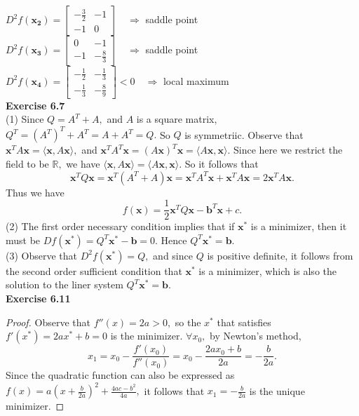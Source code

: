 \documentclass[letterpaper,12pt]{article}
\theoremstyle{definition}
\renewcommand{\vec}[1]{\mathbf{#1}}
\begin{document}
$D^2f(\vec{x_2})=\begin{bmatrix}
-\frac{3}{2}&-1\\-1&0
\end{bmatrix} \quad \Rightarrow$  saddle point\\
$D^2f(\vec{x_3})=\begin{bmatrix}
0&-1\\-1&-\frac{8}{3}
\end{bmatrix} \quad \Rightarrow$  saddle point\\
$D^2f(\vec{x_4})=\begin{bmatrix}
-\frac{1}{2}&-\frac{1}{3}\\-\frac{1}{3}&-\frac{8}{9}
\end{bmatrix}<0 \quad \Rightarrow$  local maximum\\


\noindent\textbf{Exercise 6.7}\\
(1) Since $Q = A^T + A,$ and $A$ is a square matrix, $Q^T = (A^T)^T + A^T = A + A^T = Q.$ So $Q$ is symmetriic.
Observe that $\vec{x}^T A \vec{x} = \langle \vec{x}, A\vec{x}\rangle,$ and $\vec{x}^T A^T \vec{x} = (A\vec{x})^T \vec{x} = \langle A\vec{x}, \vec{x}\rangle.$ Since here we restrict the field to be $\mathbb{R},$ we have $\langle \vec{x}, A\vec{x}\rangle =  \langle A\vec{x}, \vec{x}\rangle.$
So it follows that $$\vec{x}^T Q \vec{x} = \vec{x}^T (A^T + A) \vec{x} = \vec{x}^T A^T\vec{x} + \vec{x}^T A \vec{x} = 2\vec{x}^T A \vec{x}.$$ Thus we have $$f(\vec{x}) = \frac{1}{2}\vec{x}^T Q \vec{x} - \vec{b}^T \vec{x} + c.$$
(2) The first order necessary condition implies that if $\vec{x^*}$ is a minimizer, then it must be $Df{(\vec{x^*})}=Q^T \vec{x^*}-\vec{b} = 0.$ Hence $Q^T \vec{x^*} = \vec{b}.$ \\
(3) Observe that $D^2 f(\vec{x^*}) = Q,$ and since $Q$ is positive definite, it follows from the second order sufficient condition that $\vec{x^*}$ is a minimizer, which is also the solution to the liner system $Q^T \vec{x^*} = \vec{b}.$ \\

\noindent\textbf{Exercise 6.11}
\begin{proof}
  Observe that $f''(x) = 2a > 0,$ so the $x^*$ that satisfies $f'(x^*) = 2ax^* + b = 0$ is the minimizer. $\forall x_0,$ by Newton's method, $$x_1 = x_0 - \frac{f'(x_0)}{f''(x_0)} = x_0 - \frac{2ax_0+b}{2a} = -\frac{b}{2a}.$$ Since the quadratic function can also be expressed as $f(x) = a(x+\frac{b}{2a})^2 + \frac{4ac-b^2}{4a},$ it follows that $x_1 = -\frac{b}{2a}$ is the unique minimizer.
\end{proof}
\end{document}
